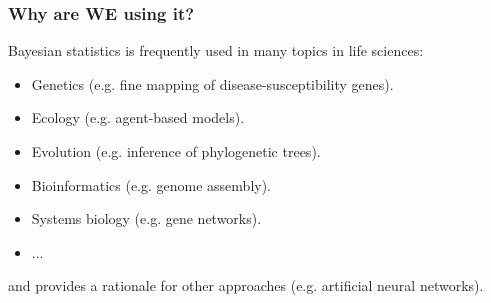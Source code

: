 \documentclass{beamer}
\newcommand{\1}{\ensuremath{\mathbf{1}}}
\begin{document}
%
%
%
\begin{frame}\frametitle{Why are WE using it?}
	\begin{block}{}
		Bayesian statistics is frequently used in many topics in life sciences:
		\begin{itemize}
			\item Genetics (e.g. fine mapping of disease-susceptibility genes).
			\item Ecology (e.g. agent-based models).
			\item Evolution (e.g. inference of phylogenetic trees).
			\item Bioinformatics (e.g. genome assembly).
			\item Systems biology (e.g. gene networks).
			\item ...
		\end{itemize}
		and provides a rationale for other approaches (e.g. artificial neural networks).
	\end{block}
\end{frame}
%
%
%
\end{document}
